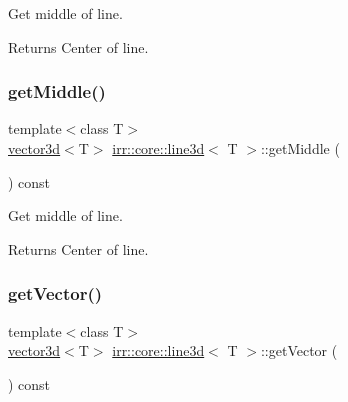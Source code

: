 Get middle of line. 

\begin{DoxyReturn}{Returns}
Center of line. 
\end{DoxyReturn}
\mbox{\label{classirr_1_1core_1_1line3d_a14d8d80862836da4ecf51db9dcab95ee}} 
\subsubsection{\texorpdfstring{get\+Middle()}{getMiddle()}\hspace{0.1cm}{\footnotesize\ttfamily [2/2]}}
{\footnotesize\ttfamily template$<$class T$>$ \\
\hyperlink{classirr_1_1core_1_1vector3d}{vector3d}$<$T$>$ \hyperlink{classirr_1_1core_1_1line3d}{irr\+::core\+::line3d}$<$ T $>$\+::get\+Middle (\begin{DoxyParamCaption}{ }\end{DoxyParamCaption}) const\hspace{0.3cm}{\ttfamily [inline]}}



Get middle of line. 

\begin{DoxyReturn}{Returns}
Center of line. 
\end{DoxyReturn}
\mbox{\label{classirr_1_1core_1_1line3d_a8df2350580b6be884b6f6d48c8932795}} 
\subsubsection{\texorpdfstring{get\+Vector()}{getVector()}\hspace{0.1cm}{\footnotesize\ttfamily [1/2]}}
{\footnotesize\ttfamily template$<$class T$>$ \\
\hyperlink{classirr_1_1core_1_1vector3d}{vector3d}$<$T$>$ \hyperlink{classirr_1_1core_1_1line3d}{irr\+::core\+::line3d}$<$ T $>$\+::get\+Vector (\begin{DoxyParamCaption}{ }\end{DoxyParamCaption}) const\hspace{0.3cm}{\ttfamily [inline]}}



